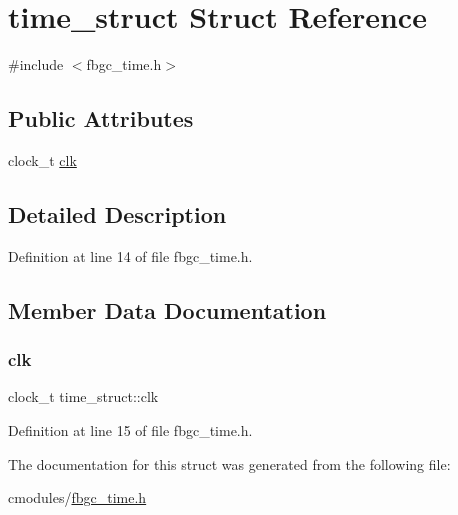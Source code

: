 \hypertarget{structtime__struct}{}\section{time\+\_\+struct Struct Reference}
\label{structtime__struct}


{\ttfamily \#include $<$fbgc\+\_\+time.\+h$>$}

\subsection*{Public Attributes}
\begin{DoxyCompactItemize}
\item 
clock\+\_\+t \hyperlink{structtime__struct_ad36d340013ce411f4b4392d15240a2e1}{clk}
\end{DoxyCompactItemize}


\subsection{Detailed Description}


Definition at line 14 of file fbgc\+\_\+time.\+h.



\subsection{Member Data Documentation}
\mbox{\label{structtime__struct_ad36d340013ce411f4b4392d15240a2e1}} 
\subsubsection{\texorpdfstring{clk}{clk}}
{\footnotesize\ttfamily clock\+\_\+t time\+\_\+struct\+::clk}



Definition at line 15 of file fbgc\+\_\+time.\+h.



The documentation for this struct was generated from the following file\+:\begin{DoxyCompactItemize}
\item 
cmodules/\hyperlink{fbgc__time_8h}{fbgc\+\_\+time.\+h}\end{DoxyCompactItemize}
